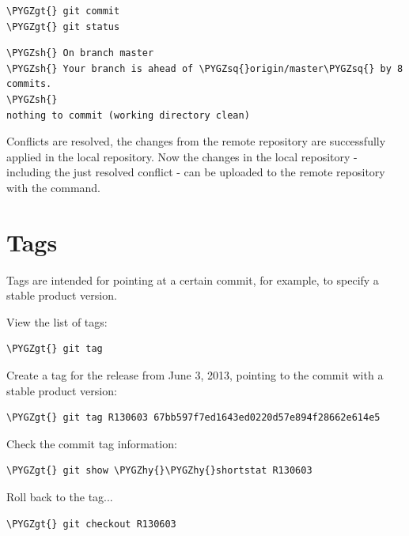 \documentclass[a4paper,12pt,oneside]{sphinxmanual}
\def\PYGZgt{\char`\>}
\def\PYGZsh{\char`\#}
\def\PYGZhy{\char`\-}
\def\PYGZsq{\char`\'}
\begin{document}
\begin{Verbatim}[commandchars=\\\{\}]
\PYGZgt{} git commit
\PYGZgt{} git status
\end{Verbatim}

\begin{Verbatim}[commandchars=\\\{\}]
\PYGZsh{} On branch master
\PYGZsh{} Your branch is ahead of \PYGZsq{}origin/master\PYGZsq{} by 8 commits.
\PYGZsh{}
nothing to commit (working directory clean)
\end{Verbatim}

Conflicts are resolved, the changes from the remote repository are successfully applied in the local repository. Now the changes in the local repository - including the just resolved conflict - can be uploaded to the remote repository with the  command.


\section{Tags}
\label{git_short_manual:id22}\label{git_short_manual:index-8}\label{git_short_manual:git-tags}
Tags are intended for pointing at a certain commit, for example, to specify a stable product version.

View the list of tags:

\begin{Verbatim}[commandchars=\\\{\}]
\PYGZgt{} git tag
\end{Verbatim}

Create a tag for the release from June 3, 2013, pointing to the commit with a stable product version:

\begin{Verbatim}[commandchars=\\\{\}]
\PYGZgt{} git tag R130603 67bb597f7ed1643ed0220d57e894f28662e614e5
\end{Verbatim}

Check the commit tag information:

\begin{Verbatim}[commandchars=\\\{\}]
\PYGZgt{} git show \PYGZhy{}\PYGZhy{}shortstat R130603
\end{Verbatim}

Roll back to the tag...

\begin{Verbatim}[commandchars=\\\{\}]
\PYGZgt{} git checkout R130603
\end{Verbatim}
\end{document}
